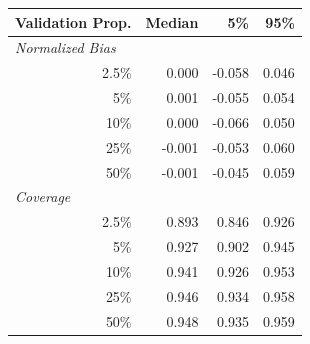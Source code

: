 
\begin{tabular}{r|rrr}
\toprule
Validation Prop. & Median & 5\% & 95\%\\
\midrule
\multicolumn{1}{l|}{\textit{Normalized Bias}}\\
2.5\% & 0.000 & -0.058 & 0.046\\
5\% & 0.001 & -0.055 & 0.054\\
10\% & 0.000 & -0.066 & 0.050\\
25\% & -0.001 & -0.053 & 0.060\\
50\% & -0.001 & -0.045 & 0.059\\
\midrule
%
\multicolumn{1}{l|}{\textit{Coverage}}\\
2.5\% & 0.893 & 0.846 & 0.926\\
5\% & 0.927 & 0.902 & 0.945\\
10\% & 0.941 & 0.926 & 0.953\\
25\% & 0.946 & 0.934 & 0.958\\
50\% & 0.948 & 0.935 & 0.959\\
\bottomrule
\end{tabular}
